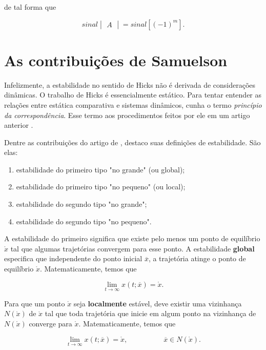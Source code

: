 \documentclass[
	12pt,				%
	openright,			%
	twoside,			%
	a4paper,			%
	english,			%
	french,				%
	spanish,			%
	brazil				%
	]{abntex2}
\newcommand{\espaco}{\hspace{5em}}
\newcommand{\xbola}{\mathring{x}}
\newcommand{\xbarra}{\overline{x}}
\begin{document}
de tal forma que

\begin{equation} \label{hicksperf}
	sinal
\begin{vmatrix}
	A
\end{vmatrix} =
 sinal[(-1)^m].
\end{equation}

\section{As contribuições de Samuelson}

Infelizmente, a estabilidade no sentido de Hicks não é derivada de considerações
dinâmicas. O trabalho de Hicks é essencialmente estático. Para tentar entender
as relações entre estática comparativa e sistemas dinâmicos, 
cunha o termo \textit{princípio da correspondência}. Esse termo aos procedimentos
feitos por ele em um artigo anterior \cite{samuelson1941}.

Dentre as contribuições do artigo de \citeyear{samuelson1941}, destaco suas
definições de estabilidade. São elas:

\begin{enumerate}
	\item estabilidade do primeiro tipo "no grande" (ou global);
	\item estabilidade do primeiro tipo "no pequeno" (ou local);
	\item estabilidade do segundo tipo "no grande";
	\item estabilidade do segundo tipo "no pequeno".
\end{enumerate}

A estabilidade do primeiro significa que existe pelo menos um ponto de equilíbrio $\xbola$ tal que
algumas trajetórias convergem para esse ponto. A estabilidade \textbf{global}
especifica que independente do ponto inicial $\xbarra$, a trajetória atinge o ponto de equilíbrio $\xbola$.
Matematicamente, temos que

\begin{equation}
	\lim_{t \to \infty} x(t; \xbarra) = \xbola.
\end{equation}

Para que um ponto $\xbola$ seja \textbf{localmente} estável, deve existir uma vizinhança
$N(\xbola)$ de $\xbola$ tal que toda trajetória que inicie em algum ponto na vizinhança de $N(\xbola)$
converge para $\xbola$. Matematicamente, temos que

\begin{equation}
	\lim_{t \to \infty} x(t; \xbarra) = \xbola, \espaco \xbarra \in N(\xbola).
\end{equation}
\end{document}
